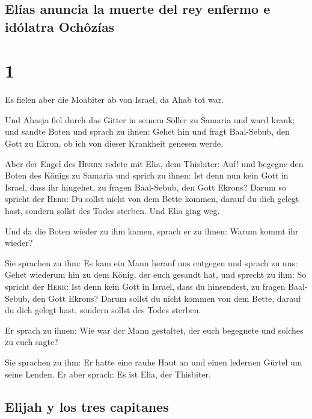 \hypertarget{eluxedas-anuncia-la-muerte-del-rey-enfermo-e-iduxf3latra-ochuxf4zuxedas}{%
\subsection{Elías anuncia la muerte del rey enfermo e idólatra
Ochôzías}\label{eluxedas-anuncia-la-muerte-del-rey-enfermo-e-iduxf3latra-ochuxf4zuxedas}}

\hypertarget{section}{%
\section{1}\label{section}}

 Es fielen aber die Moabiter ab von Israel, da Ahab tot
war.

 Und Ahasja fiel durch das Gitter in seinem Söller zu
Samaria und ward krank; und sandte Boten und sprach zu ihnen: Gehet hin
und fragt Baal-Sebub, den Gott zu Ekron, ob ich von dieser Krankheit
genesen werde.

 Aber der Engel des \textsc{Herrn} redete mit Elia, dem
Thisbiter: Auf! und begegne den Boten des Königs zu Samaria und sprich
zu ihnen: Ist denn nun kein Gott in Israel, dass ihr hingehet, zu fragen
Baal-Sebub, den Gott Ekrons?  Darum so spricht der
\textsc{Herr}: Du sollst nicht von dem Bette kommen, darauf du dich
gelegt hast, sondern sollst des Todes sterben. Und Elia ging weg.

 Und da die Boten wieder zu ihm kamen, sprach er zu ihnen:
Warum kommt ihr wieder?

 Sie sprachen zu ihm: Es kam ein Mann herauf uns entgegen
und sprach zu uns: Gehet wiederum hin zu dem König, der euch gesandt
hat, und sprecht zu ihm: So spricht der \textsc{Herr}: Ist denn kein
Gott in Israel, dass du hinsendest, zu fragen Baal-Sebub, den Gott
Ekrons? Darum sollst du nicht kommen von dem Bette, darauf du dich
gelegt hast, sondern sollst des Todes sterben.

 Er sprach zu ihnen: Wie war der Mann gestaltet, der euch
begegnete und solches zu euch sagte?

 Sie sprachen zu ihm: Er hatte eine rauhe Haut an und
einen ledernen Gürtel um seine Lenden. Er aber sprach: Es ist Elia, der
Thisbiter.

\hypertarget{elijah-y-los-tres-capitanes}{%
\subsection{Elijah y los tres
capitanes}\label{elijah-y-los-tres-capitanes}}


